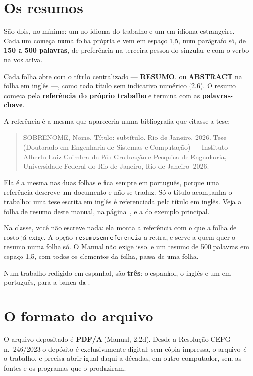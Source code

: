 \documentclass[dsc]{ufrj}
\begin{document}
  \section{Os resumos}

  São dois, no mínimo: um no idioma do trabalho e um em idioma estrangeiro. Cada
  um começa numa folha própria e vem em espaço 1,5, num parágrafo só, de
  \textbf{150 a 500 palavras}, de preferência na terceira pessoa do singular e
  com o verbo na voz ativa.

  Cada folha abre com o título centralizado --- \textbf{RESUMO}, ou
  \textbf{ABSTRACT} na folha em inglês ---, como todo título sem indicativo
  numérico (2.6). O resumo começa pela \textbf{referência do próprio trabalho} e
  termina com as \textbf{palavras-chave}.

  A referência é a mesma que apareceria numa bibliografia que citasse a tese:

  \begin{quote}
    \singlespacing\small
    SOBRENOME, Nome. Título: subtítulo. Rio de Janeiro, 2026. Tese (Doutorado em
    Engenharia de Sistemas e Computação) --- Instituto Alberto Luiz Coimbra de
    Pós-Graduação e Pesquisa de Engenharia, Universidade Federal do Rio de
    Janeiro, Rio de Janeiro, 2026.
  \end{quote}

  Ela é a mesma nas duas folhas e fica sempre em português, porque uma
  referência descreve um documento e não se traduz. Só o título acompanha o
  trabalho: uma tese escrita em inglês é referenciada pelo título em inglês.
  Veja a folha de resumo deste manual, na página~\pageref{norma:resumo}, e a
  do exemplo principal.

  Na classe, você não escreve nada: ela monta a referência com o que a folha de
  rosto já exige. A opção \verb|resumosemreferencia| a retira, e serve a quem
  quer o resumo numa folha só. O Manual não exige isso, e um resumo de 500
  palavras em espaço 1,5, com todos os elementos da folha, passa de uma folha.

  Num trabalho redigido em espanhol, são \textbf{três}: o espanhol, o inglês e um
  em português, para a banca da .

  \section{O formato do arquivo}

  O arquivo depositado é \textbf{PDF/A} (Manual, 2.2d). Desde a Resolução CEPG
  n.~246/2023 o depósito é exclusivamente digital: sem cópia impressa, o arquivo
  \emph{é} o trabalho, e precisa abrir igual daqui a décadas, em outro
  computador, sem as fontes e os programas que o produziram.
\end{document}
